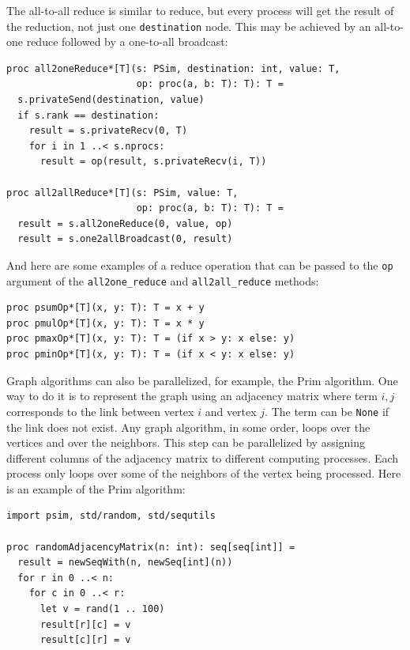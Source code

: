 \documentclass[justified, sixbynine]{tufte-book}
\def\ft{\small\tt}
\theoremstyle{plain}%
\newtheorem * {corollary}{Corollary}
\theoremstyle{definition}
\theoremstyle{remark}
\newtheorem * {remark}{Remark}
\newtheorem * {note}{Note}
\begin{document}
\begin{fullwidth}
The all-to-all reduce is similar to reduce, but every process will get the result of the reduction, not just one {\ft destination} node. This may be achieved by an all-to-one reduce followed by a one-to-all broadcast:

\begin{lstlisting}[caption={in file: {\ft psim.nim}}]
proc all2oneReduce*[T](s: PSim, destination: int, value: T,
                       op: proc(a, b: T): T): T =
  s.privateSend(destination, value)
  if s.rank == destination:
    result = s.privateRecv(0, T)
    for i in 1 ..< s.nprocs:
      result = op(result, s.privateRecv(i, T))

proc all2allReduce*[T](s: PSim, value: T,
                       op: proc(a, b: T): T): T =
  result = s.all2oneReduce(0, value, op)
  result = s.one2allBroadcast(0, result)
\end{lstlisting}

And here are some examples of a reduce operation that can be passed to the {\ft op} argument of the {\ft all2one\_reduce} and {\ft all2all\_reduce} methods:

\begin{lstlisting}[caption={in file: {\ft psim.nim}}]
proc psumOp*[T](x, y: T): T = x + y
proc pmulOp*[T](x, y: T): T = x * y
proc pmaxOp*[T](x, y: T): T = (if x > y: x else: y)
proc pminOp*[T](x, y: T): T = (if x < y: x else: y)
\end{lstlisting}

Graph algorithms can also be parallelized, for example, the Prim algorithm. One way to do it is to represent the graph using an adjacency matrix where term $i, j$ corresponds to the link between vertex $i$ and vertex $j$. The term can be {\ft None} if the link does not exist. Any graph algorithm, in some order, loops over the vertices and over the neighbors. This step can be parallelized by assigning different columns of the adjacency matrix to different computing processes. Each process only loops over some of the neighbors of the vertex being processed. Here is an example of the Prim algorithm:

\begin{lstlisting}[caption={in file: {\ft psim\_prim.nim}}]
import psim, std/random, std/sequtils

proc randomAdjacencyMatrix(n: int): seq[seq[int]] =
  result = newSeqWith(n, newSeq[int](n))
  for r in 0 ..< n:
    for c in 0 ..< r:
      let v = rand(1 .. 100)
      result[r][c] = v
      result[c][r] = v


\end{lstlisting}
\end{fullwidth}
\end{document}
